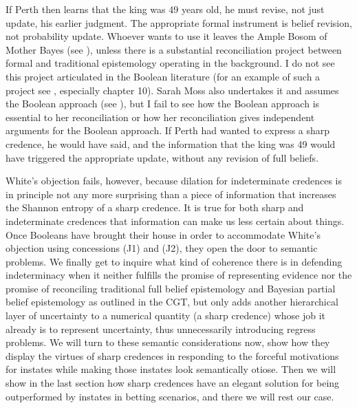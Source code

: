 \documentclass[11pt]{article}
\begin{document}

If Perth then learns that the king was 49 years old, he must revise,
not just update, his earlier judgment. The appropriate formal
instrument is belief revision, not probability update. Whoever wants
to use it leaves the Ample Bosom of Mother Bayes (see
), unless there is a substantial reconciliation
project between formal and traditional epistemology operating in the
background. I do not see this project articulated in the Boolean
literature (for an example of such a project see ,
especially chapter 10). Sarah Moss also undertakes it and assumes the
Boolean approach (see ), but I fail to see how the
Boolean approach is essential to her reconciliation or how her
reconciliation gives independent arguments for the Boolean approach.
If Perth had wanted to express a sharp credence, he would have said,
 and the
information that the king was 49 would have triggered the appropriate
update, without any revision of full beliefs.

White's objection fails, however, because dilation for indeterminate
credences is in principle not any more surprising than a piece of
information that increases the Shannon entropy of a sharp credence. It
is true for both sharp and indeterminate credences that information
can make us less certain about things. Once Booleans have brought
their house in order to accommodate White's objection using
concessions (J1) and (J2), they open the door to semantic problems. We
finally get to inquire what kind of coherence there is in defending
indeterminacy when it neither fulfills the promise of representing
evidence nor the promise of reconciling traditional full belief
 epistemology and Bayesian partial belief
epistemology as outlined in the CGT, but only adds another
hierarchical layer of uncertainty to a numerical quantity (a sharp
credence) whose job it already is to represent uncertainty, thus
unnecessarily introducing regress problems. We will turn to these
semantic considerations now, show how they display the virtues of
sharp credences in responding to the forceful motivations for instates
while making those instates look semantically otiose. Then we will
show in the last section how sharp credences have an elegant solution
for being outperformed by instates in betting scenarios, and there we
will rest our case.
\end{document}
